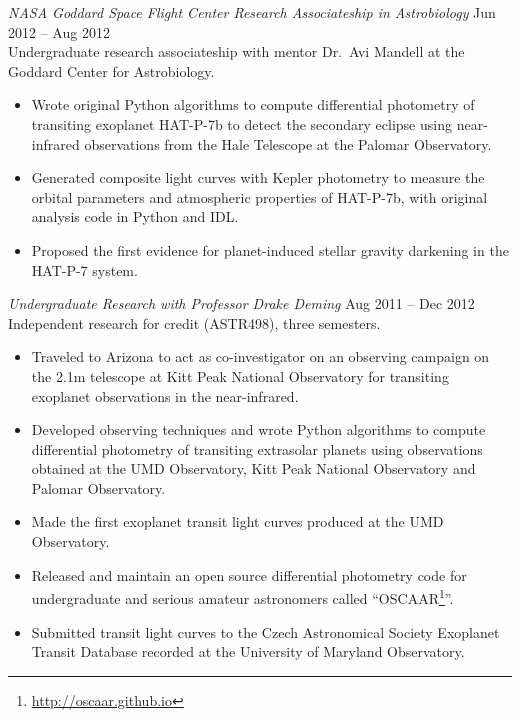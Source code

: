 \documentclass[margin]{res}
\begin{document}
\begin{resume}
                {\sl NASA Goddard Space Flight Center Research Associateship in Astrobiology} \hfill            Jun 2012 -- Aug 2012 \\
                Undergraduate research associateship with mentor Dr.\ Avi Mandell at the Goddard Center for Astrobiology.
                 \begin{itemize}%
                 \item Wrote original Python algorithms to compute differential photometry of transiting exoplanet HAT-P-7b to 
                 detect the secondary eclipse using near-infrared observations from the Hale Telescope at the Palomar Observatory. 
                 \item Generated composite light curves with Kepler photometry to measure the orbital parameters and atmospheric 
                 properties of HAT-P-7b, with original analysis code in Python and IDL. 
                 \item Proposed the first evidence for planet-induced stellar gravity darkening in the HAT-P-7 system.
                 \end{itemize}  

                {\sl Undergraduate Research with Professor Drake Deming} \hfill            Aug 2011 -- Dec 2012 \\
                Independent research for credit (ASTR498), three semesters. 
                 \begin{itemize}   
        \item Traveled to Arizona to act as co-investigator on an observing campaign on the 2.1m telescope at Kitt Peak National Observatory for transiting 
        exoplanet observations in the near-infrared. 
                 \item Developed observing techniques and wrote Python algorithms to compute differential photometry 
                 of transiting extrasolar planets using observations obtained at the UMD Observatory, Kitt Peak National Observatory and Palomar Observatory. 
        \item Made the first exoplanet transit light curves produced at the UMD Observatory.
        \item Released and maintain an open source differential photometry code for undergraduate and serious amateur astronomers called ``OSCAAR\footnote{\url{http://oscaar.github.io}}''.
                 \item Submitted transit light curves to the Czech Astronomical Society Exoplanet Transit Database recorded at the University of Maryland Observatory.
                 \end{itemize} 


\end{resume}
\end{document}
